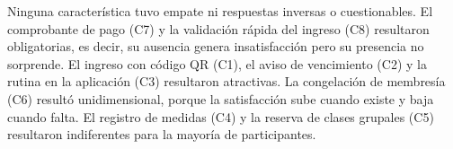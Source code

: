 Ninguna característica tuvo empate ni respuestas inversas o cuestionables. El comprobante de pago (C7) y la validación rápida del ingreso (C8) resultaron obligatorias, es decir, su ausencia genera insatisfacción pero su presencia no sorprende. El ingreso con código QR (C1), el aviso de vencimiento (C2) y la rutina en la aplicación (C3) resultaron atractivas. La congelación de membresía (C6) resultó unidimensional, porque la satisfacción sube cuando existe y baja cuando falta. El registro de medidas (C4) y la reserva de clases grupales (C5) resultaron indiferentes para la mayoría de participantes.
